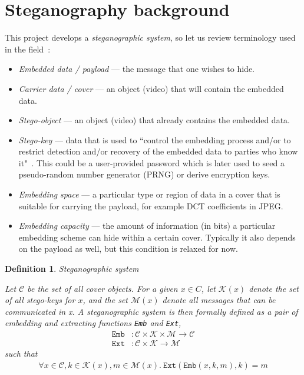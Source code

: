 \documentclass[12pt,british,twoside,notitlepage,usenames,dvipsnames,hypens,final]{report}
\newtheorem{definition}{Definition}
\numberwithin{equation}{section}
\numberwithin{figure}{section}
\begin{document}
\section{Steganography background}

This project develops a \emph{steganographic system}, so let us review terminology used in the field~\cite{infohiding-survey, bateman}:
\begin{itemize}
\item \emph{Embedded data / payload} --- the message that one wishes to hide.
\item \emph{Carrier data / cover} --- an object (video) that will contain the embedded data.
\item \emph{Stego-object} --- an object (video) that already contains the embedded data.
\item \emph{Stego-key} ---  data that is used to ``control the embedding process and/or to restrict detection and/or recovery of the embedded data to parties who know it"~\cite{infohiding-survey}. This could be a user-provided password which is later used to seed a pseudo-random number generator (PRNG) or derive encryption keys. 
\item \emph{Embedding space} --- a particular type or region of data in a cover that is suitable for carrying the payload, for example DCT coefficients in JPEG.
\item \emph{Embedding capacity} --- the amount of information (in bits) a particular embedding scheme can hide within a certain cover. Typically it also depends on the payload as well, but this condition is relaxed for now.
\end{itemize}

\begin{definition}{Steganographic system~\cite[p.~53]{fridrich}}

Let $\mathcal{C}$ be the set of all cover objects. For a given $x \in C$, let $\mathcal{K}(x)$ denote the set of all stego-keys for $x$, and the set $\mathcal{M}(x)$ denote all messages that can be communicated in x. A steganographic system is then formally defined as a pair of embedding and extracting functions \texttt{Emb} and \texttt{Ext},
\begin{align*}
\texttt{Emb} &: \mathcal{C} \times \mathcal{K} \times \mathcal{M} \rightarrow \mathcal{C} \\
\texttt{Ext} &: \mathcal{C} \times \mathcal{K} \rightarrow \mathcal{M}
\end{align*}
\vspace{-1mm}
such that
\vspace{-1mm}
\begin{align*}
\forall x \in \mathcal{C}, k \in \mathcal{K}(x), m \in \mathcal{M}(x) . ~ \texttt{Ext}(\texttt{Emb}(x, k, m), k) = m
\end{align*}

\end{definition}
\end{document}
